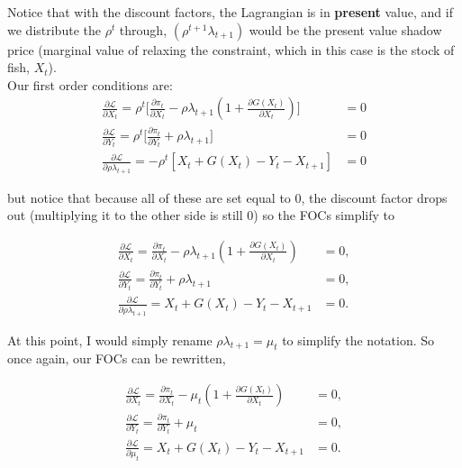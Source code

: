 \documentclass[12pt]{article}
\begin{document}
Notice that with the discount factors, the Lagrangian is in \textbf{present} value, and if we distribute the $\rho^t$ through, $(\rho^{t+1} \lambda_{t+1})$ would be the present value shadow price (marginal value of relaxing the constraint, which in this case is the stock of fish, $X_t$). \\

Our first order conditions are: 
\begin{align}
    \frac{\partial \mathcal{L}}{\partial X_t} = \rho^t \Big[\frac{\partial \pi_t}{\partial X_t} - \rho \lambda_{t+1}(1 + \frac{\partial G(X_t)}{\partial X_t}) \Big] &= 0 \\
    \frac{\partial \mathcal{L}}{\partial Y_t} = \rho^t \Big[\frac{\partial \pi_t}{\partial Y_t} + \rho \lambda_{t+1} \Big] &= 0 \\
    \frac{\partial \mathcal{L}}{\partial \rho \lambda_{t+1}} = - \rho^t [X_t +G(X_t) - Y_t - X_{t+1}] &= 0
\end{align}

but notice that because all of these are set equal to 0, the discount factor drops out (multiplying it to the other side is still 0) so the FOCs simplify to 

\begin{align}
    \frac{\partial \mathcal{L}}{\partial X_t} = \frac{\partial \pi_t}{\partial X_t} - \rho \lambda_{t+1}(1 + \frac{\partial G(X_t)}{\partial X_t})  &= 0, \\
    \frac{\partial \mathcal{L}}{\partial Y_t} = \frac{\partial \pi_t}{\partial Y_t} + \rho \lambda_{t+1}  &= 0, \\
    \frac{\partial \mathcal{L}}{\partial \rho \lambda_{t+1}} = X_t +G(X_t) - Y_t - X_{t+1} &= 0.
\end{align}

At this point, I would simply rename $\rho \lambda_{t+1} = \mu_t$ to simplify the notation. So once again, our FOCs can be rewritten, 


\begin{align}
    \frac{\partial \mathcal{L}}{\partial X_t} = \frac{\partial \pi_t}{\partial X_t} - \mu_t(1 + \frac{\partial G(X_t)}{\partial X_t})  &= 0,  \label{FOC_1}\\
    \frac{\partial \mathcal{L}}{\partial Y_t} = \frac{\partial \pi_t}{\partial Y_t} + \mu_t  &= 0, \label{FOC_2} \\
    \frac{\partial \mathcal{L}}{\partial \mu_t} = X_t +G(X_t) - Y_t - X_{t+1} &= 0 \label{FOC_constraint}.
\end{align}
\end{document}
